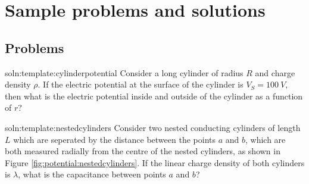 \newpage
\section{Sample problems and solutions}

\subsection{Problems}
\begin{problem}{soln:template:cylinderpotential}{\label{prob:template:cylinderpotential} 
Consider a long cylinder of radius $R$ and charge density $\rho$. If the electric potential at the surface of the cylinder is $V_S = \SI{100}{V}$, then what is the electric potential inside and outside of the cylinder as a function of $r$?}

\end{problem}

\begin{problem}{soln:template:nestedcylinders}{\label{prob:template:nestedcylinders} 
		Consider two nested conducting cylinders of length $L$ which are seperated by the distance between the points $a$ and $b$, which are both measured radially from the centre of the nested cylinders, as shown in Figure \ref{fig:potential:nestedcylinders}. If the linear charge density of both cylinders is $\lambda$, what is the capacitance between points $a$ and $b$?}
	
	
\end{problem}
\newpage

